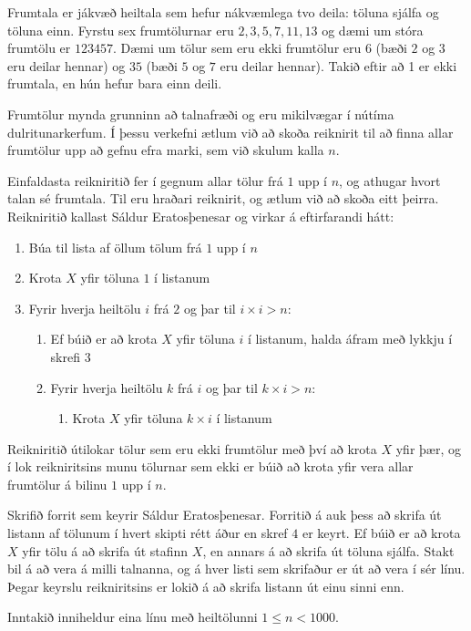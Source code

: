 
Frumtala er jákvæð heiltala sem hefur nákvæmlega tvo deila: töluna sjálfa og
töluna einn. Fyrstu sex frumtölurnar eru $2, 3, 5, 7, 11, 13$ og dæmi um stóra
frumtölu er $123457$. Dæmi um tölur sem eru ekki frumtölur eru $6$ (bæði $2$ og $3$ eru
deilar hennar) og $35$ (bæði $5$ og $7$ eru deilar hennar). Takið eftir að 1 er ekki
frumtala, en hún hefur bara einn deili.

Frumtölur mynda grunninn að talnafræði og eru mikilvægar í nútíma
dulritunarkerfum. Í þessu verkefni ætlum við að skoða reiknirit til að finna allar
frumtölur upp að gefnu efra marki, sem við skulum kalla $n$.

Einfaldasta reikniritið fer í gegnum allar tölur frá $1$ upp í $n$, og athugar
hvort talan sé frumtala. Til eru hraðari reiknirit, og ætlum við að skoða eitt
þeirra. Reikniritið kallast Sáldur Eratosþenesar og virkar
á eftirfarandi hátt:

\begin{enumerate}
    \item Búa til lista af öllum tölum frá $1$ upp í $n$
    \item Krota $X$ yfir töluna $1$ í listanum
    \item Fyrir hverja heiltölu $i$ frá $2$ og þar til $i\times i > n$:
        \begin{enumerate}
            \item Ef búið er að krota $X$ yfir töluna $i$ í listanum, halda áfram með lykkju í skrefi $3$
            \item Fyrir hverja heiltölu $k$ frá $i$ og þar til $k\times i > n$:
                \begin{enumerate}
                    \item Krota $X$ yfir töluna $k\times i$ í listanum
                \end{enumerate}
        \end{enumerate}
    
\end{enumerate}

Reikniritið útilokar tölur sem eru ekki frumtölur með því að krota $X$ yfir
þær, og í lok reikniritsins munu tölurnar sem ekki er búið að krota yfir vera
allar frumtölur á bilinu $1$ upp í $n$.

Skrifið forrit sem keyrir Sáldur Eratosþenesar. Forritið á auk þess að skrifa
út listann af tölunum í hvert skipti rétt áður en skref $4$ er keyrt. Ef búið
er að krota $X$ yfir tölu á að skrifa út stafinn $X$, en annars á að skrifa út
töluna sjálfa. Stakt bil á að vera á milli talnanna, og á hver listi sem
skrifaður er út að vera í sér línu. Þegar keyrslu reikniritsins er lokið á að
skrifa listann út einu sinni enn.

Inntakið inniheldur eina línu með heiltölunni $1 \leq n < 1000$.
